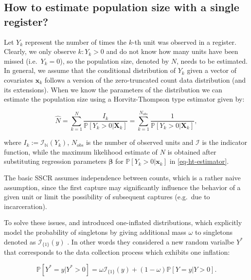 \documentclass[nojss]{jss}
\newcommand{\1}{\mathcal{I}} \newcommand{\bZero}{\boldsymbol{0}}
\begin{document}
\subsection{How to estimate population size with a single
register?}\label{how-to-estimate-population-size-with-a-single-register}

Let \(Y_{k}\) represent the number of times the \(k\)-th unit was
observed in a register. Clearly, we only observe \(k:Y_{k}>0\) and do
not know how many units have been missed (i.e.~\(Y_{k}=0\)), so the
population size, denoted by \(N\), needs to be estimated. In general, we
assume that the conditional distribution of \(Y_{k}\) given a vector of
covariates \(\boldsymbol{x}_{k}\) follows a version of the
zero-truncated count data distribution (and its extensions). When we
know the parameters of the distribution we can estimate the population
size using a Horvitz-Thompson type estimator given by:

\begin{equation}
\hat{N}=
\sum_{k=1}^{N}\frac{I_{k}}{\mathbb{P}[Y_{k}>0|\boldsymbol{X}_{k}]}=
\sum_{k=1}^{N_{obs}}\frac{1}{\mathbb{P}[Y_{k}>0|\boldsymbol{X}_{k}]},
\label{eq-ht-estimator}
\end{equation}

where \(I_{k}:=\mathcal{I}_{\mathbb{N}}(Y_{k})\), \(N_{obs}\) is the
number of observed units and \(\mathcal{I}\) is the indicator function,
while the maximum likelihood estimate of \(N\) is obtained after
substituting regression parameters \(\boldsymbol{\beta}\) for
\(\mathbb{P}[Y_{k}>0|\boldsymbol{x}_{k}]\) in \eqref{eq-ht-estimator}.

The basic SSCR assumes independence between counts, which is a rather
naive assumption, since the first capture may significantly influence
the behavior of a given unit or limit the possibility of subsequent
captures (e.g.~due to incarceration).

To solve these issues, \citet{godwin2017estimation} and
\citet{ztoi-oizt-poisson} introduced one-inflated distributions, which
explicitly model the probability of singletons by giving additional mass
\(\omega\) to singletons denoted as \(\mathcal{I}_{\{1\}}(y)\)
\citep[cf.][]{bohning2024one}. In other words they considered a new
random varialbe \(Y^{\ast}\) that corresponds to the data collection
process which exhibits one inflation:

\begin{equation*}
  \mathbb{P}\left[Y^{\ast}=y|Y^{\ast}>0\right] =
  \omega\mathcal{I}_{\{1\}}(y)+(1-\omega)\mathbb{P}[Y=y|Y>0].
\end{equation*}
\end{document}
